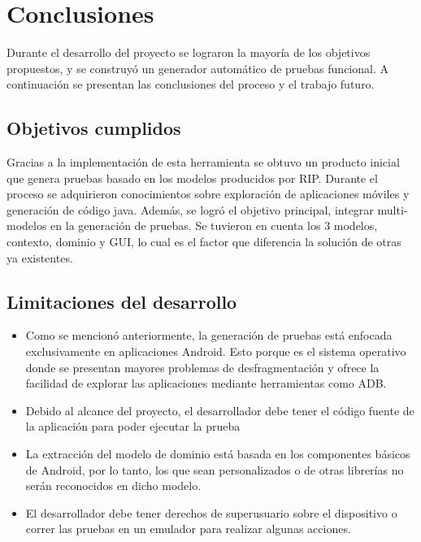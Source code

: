 %
\chapter{Conclusiones}
\label{chapter5}

Durante el desarrollo del proyecto se lograron la mayoría de los objetivos propuestos, y se construyó un generador automático de pruebas funcional. A continuación se presentan las conclusiones del proceso y el trabajo futuro.

\section{Objetivos cumplidos}

Gracias a la implementación de esta herramienta se obtuvo un producto inicial que genera pruebas basado en los modelos producidos por RIP. Durante el proceso se adquirieron conocimientos sobre exploración de aplicaciones móviles y generación de código java. Además, se logró el objetivo principal, integrar multi-modelos en la generación de pruebas. Se tuvieron en cuenta los 3 modelos, contexto, dominio y GUI, lo cual es el factor que diferencia la solución de otras ya existentes.


\section{Limitaciones del desarrollo}
\begin{itemize}
	\item Como se mencionó anteriormente, la generación de pruebas está enfocada exclusivamente en aplicaciones Android. Esto porque es el sistema operativo donde se presentan mayores problemas de desfragmentación y ofrece la facilidad de explorar las aplicaciones mediante herramientas como ADB.
	
	\item Debido al alcance del proyecto, el desarrollador debe tener el código fuente de la aplicación para poder ejecutar la prueba
	
	\item La extracción del modelo de dominio está basada en los componentes básicos de Android, por lo tanto, los que sean personalizados o de otras librerías no serán reconocidos en dicho modelo.
	
	\item El desarrollador debe tener derechos de superusuario sobre el dispositivo o correr las pruebas en un emulador para realizar algunas acciones.
	
	
\end{itemize}


